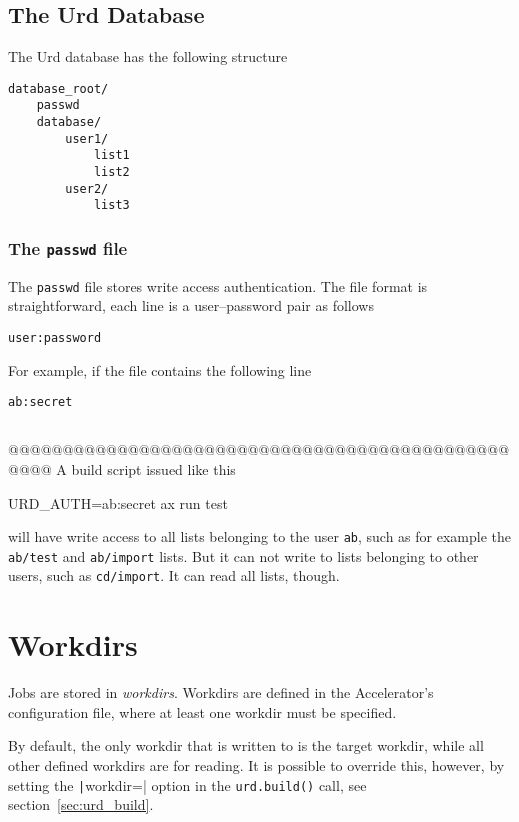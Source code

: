 \subsection{The Urd Database}
The Urd database has the following structure
\begin{verbatim}
database_root/
    passwd
    database/
        user1/
            list1
            list2
        user2/
            list3
\end{verbatim}



\subsubsection{The \texttt{passwd} file}
The \texttt{passwd} file stores write access authentication.  The file
format is straightforward, each line is a user--password pair as follows
\begin{verbatim}
user:password
\end{verbatim}
For example, if the file contains the following line
\begin{verbatim}
ab:secret
\end{verbatim}



\subsection{}
@@@@@@@@@@@@@@@@@@@@@@@@@@@@@@@@@@@@@@@@@@@@@@@@@@
A build script issued like this
\begin{shell}
URD_AUTH=ab:secret ax run test
\end{shell}
will have write access to all lists belonging to the user \texttt{ab},
such as for example the \texttt{ab/test} and \texttt{ab/import} lists.
But it can not write to lists belonging to other users, such
as \texttt{cd/import}.  It can read all lists, though.



\section{Workdirs}
Jobs are stored in \textsl{workdirs}.  Workdirs are defined in the
Accelerator's configuration file, where at least one workdir must be
specified.

By default, the only workdir that is written to is the target workdir,
while all other defined workdirs are for reading.  It is possible to
override this, however, by setting the \texttt|workdir=|
option in the \texttt{urd.build()} call, see
section~\ref{sec:urd_build}.

